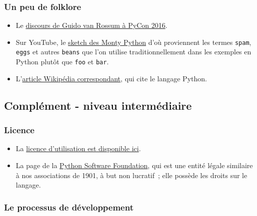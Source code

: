     \hypertarget{un-peu-de-folklore}{%
\subsubsection{Un peu de folklore}\label{un-peu-de-folklore}}

    \begin{itemize}
\tightlist
\item
  Le \href{https://www.youtube.com/watch?v=YgtL4S7Hrwo}{discours de
  Guido van Rossum à PyCon 2016}.
\item
  Sur YouTube, le
  \href{https://www.youtube.com/watch?v=anwy2MPT5RE}{sketch des Monty
  Python} d'où proviennent les termes \texttt{spam}, \texttt{eggs} et
  autres \texttt{beans} que l'on utilise traditionnellement dans les
  exemples en Python plutôt que \texttt{foo} et \texttt{bar}.
\item
  L'\href{http://en.wikipedia.org/wiki/Spam_\%28Monty_Python\%29}{article
  Wikipédia correspondant}, qui cite le langage Python.
\end{itemize}

    \hypertarget{compluxe9ment---niveau-intermuxe9diaire}{%
\subsection{Complément - niveau
intermédiaire}\label{compluxe9ment---niveau-intermuxe9diaire}}

    \hypertarget{licence}{%
\subsubsection{Licence}\label{licence}}

    \begin{itemize}
\tightlist
\item
  La \href{https://docs.python.org/3/license.html}{licence d'utilisation
  est disponible ici}.
\item
  La page de la \href{https://www.python.org/psf/}{Python Software
  Foundation}, qui est une entité légale similaire à nos associations de
  1901, à but non lucratif~; elle possède les droits sur le langage.
\end{itemize}

    \hypertarget{le-processus-de-duxe9veloppement}{%
\subsubsection{Le processus de
développement}\label{le-processus-de-duxe9veloppement}}

